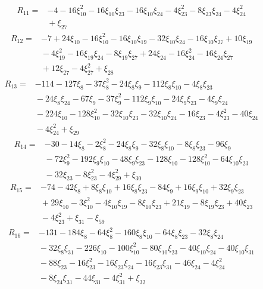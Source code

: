 \[
\begin{aligned}
 R_{11}={}&-4-16\xi_{10}^{2}-16\xi_{10}\xi_{23}-16\xi_{10}\xi_{24}-4\xi_{23}^{2}-8\xi_{23}\xi_{24}-4\xi_{24}^{2}\\
 &{}+\xi_{27}
\end{aligned}
\]
\[
\begin{aligned}
 R_{12}={}&-7+24\xi_{10}-16\xi_{10}^{2}-16\xi_{10}\xi_{19}-32\xi_{10}\xi_{24}-16\xi_{10}\xi_{27}+10\xi_{19}\\
 &{}-4\xi_{19}^{2}-16\xi_{19}\xi_{24}-8\xi_{19}\xi_{27}+24\xi_{24}-16\xi_{24}^{2}-16\xi_{24}\xi_{27}\\
 &{}+12\xi_{27}-4\xi_{27}^{2}+\xi_{28}
\end{aligned}
\]
\[
\begin{aligned}
 R_{13}={}&-114-127\xi_{8}-37\xi_{8}^{2}-24\xi_{8}\xi_{9}-112\xi_{8}\xi_{10}-4\xi_{8}\xi_{23}\\
 &{}-24\xi_{8}\xi_{24}-67\xi_{9}-37\xi_{9}^{2}-112\xi_{9}\xi_{10}-24\xi_{9}\xi_{23}-4\xi_{9}\xi_{24}\\
 &{}-224\xi_{10}-128\xi_{10}^{2}-32\xi_{10}\xi_{23}-32\xi_{10}\xi_{24}-16\xi_{23}-4\xi_{23}^{2}-40\xi_{24}\\
 &{}-4\xi_{24}^{2}+\xi_{29}
\end{aligned}
\]
\[
\begin{aligned}
 R_{14}={}&-30-14\xi_{8}-2\xi_{8}^{2}-24\xi_{8}\xi_{9}-32\xi_{8}\xi_{10}-8\xi_{8}\xi_{23}-96\xi_{9}\\
 &{}-72\xi_{9}^{2}-192\xi_{9}\xi_{10}-48\xi_{9}\xi_{23}-128\xi_{10}-128\xi_{10}^{2}-64\xi_{10}\xi_{23}\\
 &{}-32\xi_{23}-8\xi_{23}^{2}-4\xi_{29}^{2}+\xi_{30}
\end{aligned}
\]
\[
\begin{aligned}
 R_{15}={}&-74-42\xi_{8}+8\xi_{8}\xi_{10}+16\xi_{8}\xi_{23}-84\xi_{9}+16\xi_{9}\xi_{10}+32\xi_{9}\xi_{23}\\
 &{}+29\xi_{10}-3\xi_{10}^{2}-4\xi_{10}\xi_{19}-8\xi_{10}\xi_{23}+21\xi_{19}-8\xi_{19}\xi_{23}+40\xi_{23}\\
 &{}-4\xi_{23}^{2}+\xi_{31}-\xi_{59}
\end{aligned}
\]
\[
\begin{aligned}
 R_{16}={}&-131-184\xi_{8}-64\xi_{8}^{2}-160\xi_{8}\xi_{10}-64\xi_{8}\xi_{23}-32\xi_{8}\xi_{24}\\
 &{}-32\xi_{8}\xi_{31}-226\xi_{10}-100\xi_{10}^{2}-80\xi_{10}\xi_{23}-40\xi_{10}\xi_{24}-40\xi_{10}\xi_{31}\\
 &{}-88\xi_{23}-16\xi_{23}^{2}-16\xi_{23}\xi_{24}-16\xi_{23}\xi_{31}-46\xi_{24}-4\xi_{24}^{2}\\
 &{}-8\xi_{24}\xi_{31}-44\xi_{31}-4\xi_{31}^{2}+\xi_{32}
\end{aligned}
\]
